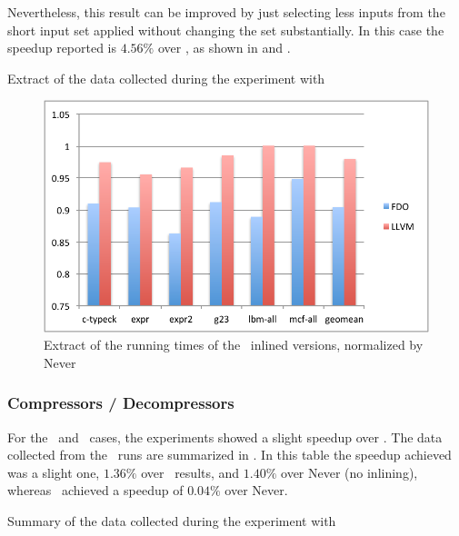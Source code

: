 Nevertheless, this result can be improved by just selecting less inputs from the short input set applied without changing the set substantially. In this case the speedup reported is $4.56 \%$ over \llvm, as shown in  and .

\begin{table}
  \centering
  \begin{tiny}
  
  \end{tiny}
  \caption{Extract of the data collected during the experiment with \gcc}
  \label{tab:speedupgcc1}
\end{table}

\begin{figure}
  \centering
  \includegraphics[width=1.00\linewidth]{Figures/speedupgcc1}
  \caption{Extract of the running times of the \gcc\ inlined versions, normalized by Never}
  \label{fig:speedupgcc1}
\end{figure}

\subsubsection{Compressors / Decompressors}

For the \bzip\ and \gzip\ cases, the experiments showed a slight speedup over \llvm. The data collected from the \bzip\ runs are summarized in . In this table the speedup achieved was a slight one, $1.36 \%$ over \llvm\ results, and $1.40 \%$ over Never (no inlining), whereas \llvm\ achieved a speedup of $0.04 \%$ over Never.

\begin{table}
  \centering
  \begin{tiny}
  
  \end{tiny}
  \caption{Summary of the data collected during the experiment with \bzip}
  \label{tab:speedupb}
\end{table}

